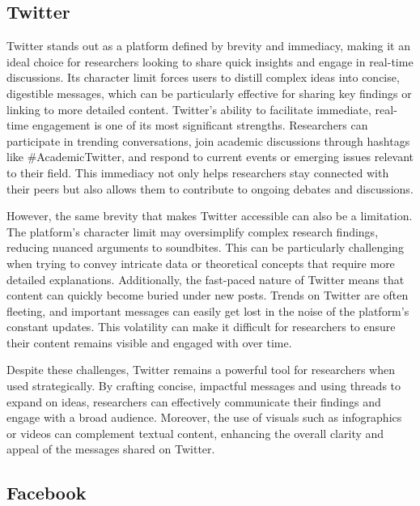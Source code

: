 \documentclass[
]{book}
\begin{document}
\subsection*{Twitter}\label{twitter}

Twitter stands out as a platform defined by brevity and immediacy, making it an ideal choice for researchers looking to share quick insights and engage in real-time discussions. Its character limit forces users to distill complex ideas into concise, digestible messages, which can be particularly effective for sharing key findings or linking to more detailed content. Twitter's ability to facilitate immediate, real-time engagement is one of its most significant strengths. Researchers can participate in trending conversations, join academic discussions through hashtags like \#AcademicTwitter, and respond to current events or emerging issues relevant to their field. This immediacy not only helps researchers stay connected with their peers but also allows them to contribute to ongoing debates and discussions.

However, the same brevity that makes Twitter accessible can also be a limitation. The platform's character limit may oversimplify complex research findings, reducing nuanced arguments to soundbites. This can be particularly challenging when trying to convey intricate data or theoretical concepts that require more detailed explanations. Additionally, the fast-paced nature of Twitter means that content can quickly become buried under new posts. Trends on Twitter are often fleeting, and important messages can easily get lost in the noise of the platform's constant updates. This volatility can make it difficult for researchers to ensure their content remains visible and engaged with over time.

Despite these challenges, Twitter remains a powerful tool for researchers when used strategically. By crafting concise, impactful messages and using threads to expand on ideas, researchers can effectively communicate their findings and engage with a broad audience. Moreover, the use of visuals such as infographics or videos can complement textual content, enhancing the overall clarity and appeal of the messages shared on Twitter.

\subsection*{Facebook}\label{facebook}
\end{document}
